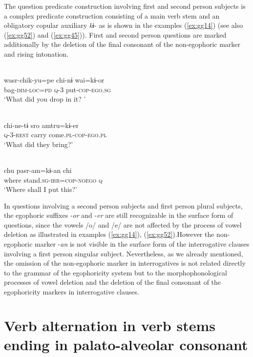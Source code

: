 \documentclass[output=paper]{langsci/langscibook}
\begin{document}
The question predicate construction involving first and second person subjects is a complex predicate construction consisting of a main verb stem and an obligatory copular auxiliary \textit{kɨ}- as is shown in the examples (\ref{ex:gg14}) (see also (\ref{ex:gg52}) and (\ref{ex:gg45})). First and second person questions are marked additionally by the deletion of the final consonant of the non-egophoric marker and rising intonation.

\ea \label{ex:gg14}
    \\
	\gll wasr-chik-yu=pe	chi-nɨ	wai=kɨ-or\\
      bag-\textsc{dim-loc=pd}	\textsc{q}-3 put-\textsc{cop-ego.sg}\\
	\glt ‘What did you drop in it? ’
	\z
	
	
\ea \label{ex:gg15}
    \\
	\gll chi-ne-tɨ	sro	amtru=kɨ-er\\
      \textsc{q}-3-\textsc{rest} carry come.\textsc{pl-cop-ego.pl}\\
	\glt ‘What did they bring?’
	\z
	
	
\ea \label{ex:gg16}
    \\
	\gll chu	pasr-am=kɨ-an	chi\\
      where	stand.\textsc{sg-irr=cop-noego}	\textsc{q}\\
	\glt ‘Where shall I put this?’
	\z

In questions involving a second person subjects and first person plural subjects, the egophoric suffixes -\textit{or} and -\textit{er} are still recognizable in the surface form of questions, since the vowels /o/ and /e/ are not affected by the process of vowel deletion as illustrated in examples (\ref{ex:gg14}), (\ref{ex:gg52}).However the non-egophoric marker -\textit{an} is not visible in the surface form of the interrogative clauses involving a first person singular subject. Nevertheless, as we already mentioned, the omission of the non-egophoric marker in interrogatives is not related directly to the grammar of the egophoricity system but to the morphophonological processes of vowel deletion and the deletion of the final consonant of the egophoricity markers in interrogative clauses.


\section{Verb alternation in verb stems ending in palato-alveolar consonant}\label{s:gg2}
\end{document}
